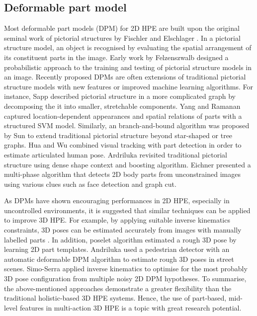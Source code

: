 \subsection{Deformable part model}  
Most deformable part models (DPM) for 2D HPE are built upon the original seminal work of pictorial structures by Fischler and Elschlager \cite{Fischler1981}. In a pictorial structure model, an object is recognised by evaluating the spatial arrangement of its constituent parts in the image. Early work by Felzenszwalb \etal \cite{Felzenszwalb2000, Felzenszwalb2005} designed a probabilistic approach to the training and testing of pictorial structure models in an image. Recently proposed DPMs are often extensions of traditional pictorial structure models with new features or improved machine learning algorithms. For instance, Sapp \etal \cite{Sapp2011} described pictorial structure in a more complicated graph by decomposing the it into smaller, stretchable components. Yang and Ramanan \cite{Yang2011} captured location-dependent appearances and spatial relations of parts with a structured SVM model. Similarly, an branch-and-bound algorithm was proposed by Sun \etal \cite{Sun2012a} to extend traditional pictorial structure beyond star-shaped or tree graphs. Hua and Wu \cite{Hua2007} combined visual tracking with part detection in order to estimate articulated human pose. Ardriluka \etal \cite{Andriluka2009} revisited traditional pictorial structure using dense shape context and boosting algorithm. Eichner \etal \cite{Eichner2012} presented a multi-phase algorithm that detects 2D body parts from unconstrained images using various clues such as face detection and graph cut. 

As DPMs have shown encouraging performances in 2D HPE, especially in uncontrolled environments, it is suggested that similar techniques can be applied to improve 3D HPE. For example, by applying suitable inverse kinematics constraints, 3D poses can be estimated accurately from images with manually labelled parts \cite{Wei2009, Ramakrishna2012}. In addition, poselet algorithm \cite{Bourdev2009} estimated a rough 3D pose by learning 2D part templates. Andriluka \etal \cite{Andriluka2010} used a pedestrian detector with an automatic deformable DPM algorithm to estimate rough 3D poses in street scenes. Simo-Serra \etal \cite{Simo-Serra2012} applied inverse kinematics to optimise for the most probably 3D pose configuration from multiple noisy 2D DPM hypotheses. To summarise, the above-mentioned approaches demonstrate a greater flexibility than the traditional holistic-based 3D HPE systems. Hence, the use of part-based, mid-level features in multi-action 3D HPE is a topic with great research potential. 

